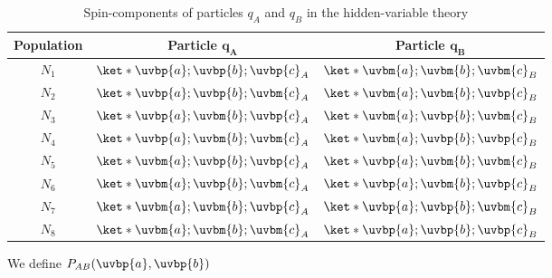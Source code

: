 \documentclass[12pt]{report}
\begin{document}
      \begin{table}[ht]
      \caption{Spin-components of particles $q_A$ and $q_B$ in the hidden-variable theory}
      \centering
      \begin{tabular}{c c c} 
      \\ 
      \hline
      \textbf{Population}& \textbf{Particle} $\bm{q_A}$ & \textbf{Particle} $\bm{q_B}$ \\ [0.5ex] 
      \hline
      $N_1$ & $\ket*{\uvbp{a};\uvbp{b};\uvbp{c}}_A$ & $\ket*{\uvbm{a};\uvbm{b};\uvbm{c}}_B$ \\ 
      
      $N_2$ & $\ket*{\uvbp{a};\uvbp{b};\uvbm{c}}_A$ & $\ket*{\uvbm{a};\uvbm{b};\uvbp{c}}_B $\\ 
      
      $N_3$ & $\ket*{\uvbp{a};\uvbm{b};\uvbp{c}}_A$ & $\ket*{\uvbm{a};\uvbp{b};\uvbm{c}}_B$ \\ 
      
      $N_4$ & $\ket*{\uvbp{a};\uvbm{b};\uvbm{c}}_A$ & $\ket*{\uvbm{a};\uvbp{b};\uvbp{c}}_B $\\ 
      
      $N_5$ & $\ket*{\uvbm{a};\uvbp{b};\uvbp{c}}_A$ & $\ket*{\uvbp{a};\uvbm{b};\uvbm{c}}_B$ \\ 
      
      $N_6$ & $\ket*{\uvbm{a};\uvbp{b};\uvbm{c}}_A$ & $\ket*{\uvbp{a};\uvbm{b};\uvbp{c}}_B$ \\ 
      
      $N_7$ & $\ket*{\uvbm{a};\uvbm{b};\uvbp{c}}_A$ & $\ket*{\uvbp{a};\uvbp{b};\uvbm{c} }_B$\\ 
      
      $N_8$ & $\ket*{\uvbm{a};\uvbm{b};\uvbm{c}}_A$ & $\ket*{\uvbp{a};\uvbp{b};\uvbp{c}}_B$ \\ 
      \hline
      \end{tabular}
      \label{hiddentable}
      \end{table}
We define $P_{AB}(\uvbp{a},\uvbp{b})$   %
%
\end{document}
